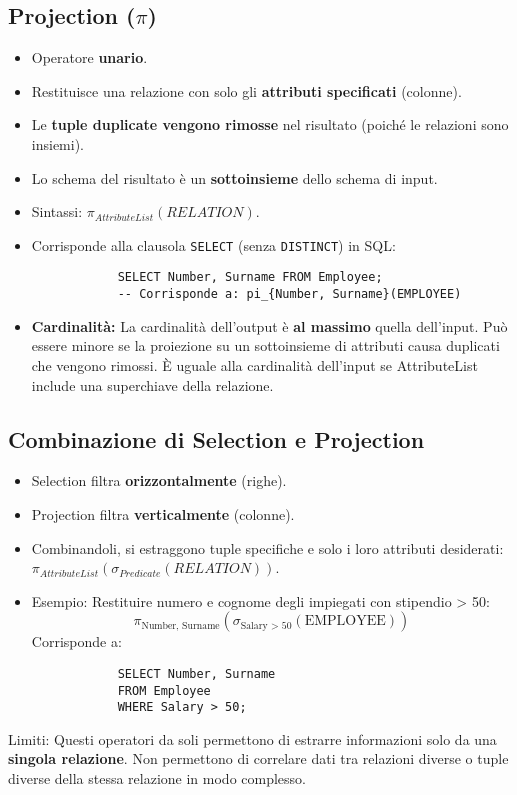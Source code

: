 \documentclass{article}
\newcommand{\selectop}[2]{\sigma_{#1}(#2)}
\newcommand{\project}[2]{\pi_{#1}(#2)}
\begin{document}
	\subsection{Projection ($\pi$)}
	\begin{itemize}
		\item Operatore \textbf{unario}.
		\item Restituisce una relazione con solo gli \textbf{attributi specificati} (colonne).
		\item Le \textbf{tuple duplicate vengono rimosse} nel risultato (poiché le relazioni sono insiemi).
		\item Lo schema del risultato è un \textbf{sottoinsieme} dello schema di input.
		\item Sintassi: $\project{AttributeList}{RELATION}$.
		\item Corrisponde alla clausola \texttt{SELECT} (senza \texttt{DISTINCT}) in SQL:
		\begin{verbatim}
			SELECT Number, Surname FROM Employee;
			-- Corrisponde a: pi_{Number, Surname}(EMPLOYEE)
		\end{verbatim}
		\item \textbf{Cardinalità:} La cardinalità dell'output è \textbf{al massimo} quella dell'input. Può essere minore se la proiezione su un sottoinsieme di attributi causa duplicati che vengono rimossi. È uguale alla cardinalità dell'input se AttributeList include una superchiave della relazione.
	\end{itemize}
	
	\subsection{Combinazione di Selection e Projection}
	\begin{itemize}
		\item Selection filtra \textbf{orizzontalmente} (righe).
		\item Projection filtra \textbf{verticalmente} (colonne).
		\item Combinandoli, si estraggono tuple specifiche e solo i loro attributi desiderati: $\project{AttributeList}{\selectop{Predicate}{RELATION}}$.
		\item Esempio: Restituire numero e cognome degli impiegati con stipendio > 50:
		$$ \pi_{\text{Number, Surname}}(\sigma_{\text{Salary > 50}}(\text{EMPLOYEE})) $$
		Corrisponde a:
		\begin{verbatim}
			SELECT Number, Surname
			FROM Employee
			WHERE Salary > 50;
		\end{verbatim}
	\end{itemize}
	Limiti: Questi operatori da soli permettono di estrarre informazioni solo da una \textbf{singola relazione}. Non permettono di correlare dati tra relazioni diverse o tuple diverse della stessa relazione in modo complesso.
	
\end{document}
